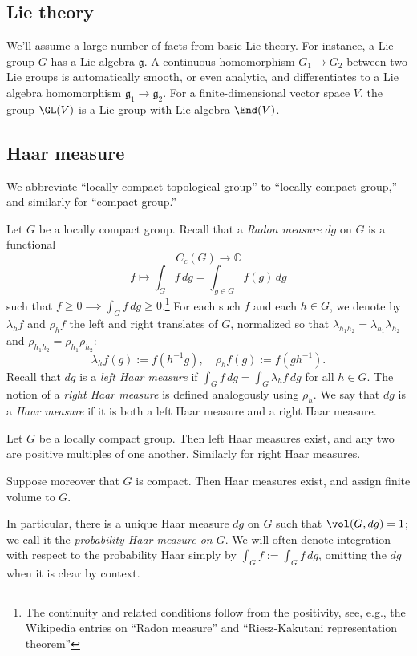 \documentclass[reqno]{amsart} 
\begin{document}
\subsection{Lie theory}
We'll assume a large number of facts from basic Lie theory.  For instance, a Lie group $G$ has a Lie algebra $\mathfrak{g}$.  A continuous homomorphism $G_1 \rightarrow G_2$ between two Lie groups is automatically smooth, or even analytic, and differentiates to a Lie algebra homomorphism $\mathfrak{g}_1 \rightarrow \mathfrak{g}_2$.  For a finite-dimensional vector space $V$, the group $\GL(V)$ is a Lie group with Lie algebra $\End(V)$.


\subsection{Haar measure}
We abbreviate ``locally compact topological group'' to ``locally compact group,'' and similarly for ``compact group.''
\begin{definition}
  Let $G$ be a locally compact group.  Recall that a \emph{Radon measure} $d g$ on $G$ is a functional
  \begin{equation*}
    C_c(G) \rightarrow \mathbb{C}
  \end{equation*}
  \begin{equation*}
    f \mapsto \int_G f \, d g = \int_{g \in G} f(g) \, d g
  \end{equation*}
  such that $f \geq 0 \implies \int_G f \, d g \geq 0$.\footnote{The continuity and related conditions follow from the positivity, see, e.g., the Wikipedia entries on ``Radon measure'' and ``Riesz-Kakutani representation theorem''}  For each such $f$ and each $h \in G$, we denote by $\lambda_h f$ and $\rho_h f$ the left and right translates of $G$, normalized so that $\lambda_{h_1 h_2} = \lambda_{h_1} \lambda_{h_2}$ and $\rho_{h_1 h_2} = \rho_{h_1} \rho_{h_2}$:
  \begin{equation*}
    \lambda_h f(g) := f(h^{-1} g), \quad \rho_h f(g) := f(g h^{-1}).
  \end{equation*}
  Recall that $d g$ is a \emph{left Haar measure} if $\int_G f \, d g = \int_G \lambda_{h} f \, d g$ for all $h \in G$.  The notion of a \emph{right Haar measure} is defined analogously using $\rho_h$.  We say that $d g$ is a \emph{Haar measure} if it is both a left Haar measure and a right Haar measure.
\end{definition}

\begin{theorem}
  Let $G$ be a locally compact group.  Then left Haar measures exist, and any two are positive multiples of one another.  Similarly for right Haar measures.
  
  Suppose moreover that $G$ is compact.  Then Haar measures exist, and assign finite volume to $G$.
\end{theorem}
In particular, there is a unique Haar measure $d g$ on $G$ such that $\vol(G,d g) = 1$; we call it the \emph{probability Haar measure on $G$}.  We will often denote integration with respect to the probability Haar simply by $\int_G f := \int_G f \, d g$, omitting the $d g$ when it is clear by context.
\end{document}
